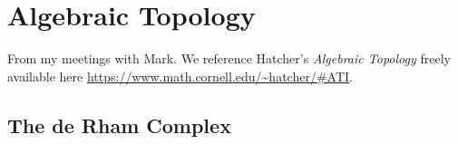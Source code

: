 \chapter{Algebraic Topology}
From my meetings with Mark. We reference Hatcher's \emph{Algebraic
  Topology} \cite{hatcher} freely available here
\url{https://www.math.cornell.edu/~hatcher/#ATI}.

\section{The de Rham Complex}


